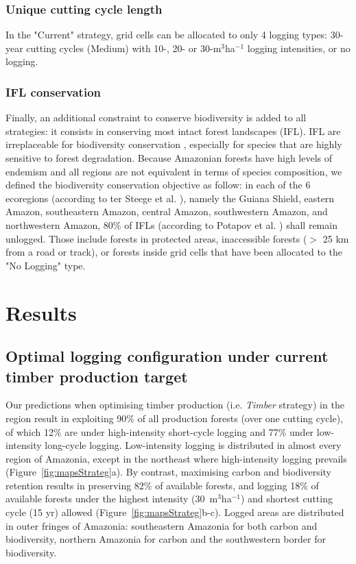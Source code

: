 \documentclass{article}
\begin{document}
\subsubsection{Unique cutting cycle length}

In the "Current" strategy, grid cells can be allocated to only 4 logging types: 30-year cutting cycles (Medium) with 10-, 20- or 30-m$^3$ha$^{-1}$ logging intensities, or no logging. 

\subsubsection{IFL conservation}

Finally, an additional constraint  to conserve biodiversity is added to all strategies: it consists in conserving most intact forest landscapes (IFL). IFL are irreplaceable for biodiversity conservation \cite{Gibson2011}, especially for species that are highly sensitive to forest degradation. Because Amazonian forests have high levels of endemism and all regions are not equivalent in terms of species composition, we defined the biodiversity conservation objective as follow: in each of the 6 ecoregions (according to ter Steege et al. \cite{TerSteege2013}), namely the Guiana Shield, eastern Amazon, southeastern Amazon, central Amazon, southwestern Amazon, and northwestern Amazon, 80\% of IFLs (according to Potapov et al. \cite{Potapov2017}) shall remain unlogged. Those include forests in protected areas, inaccessible forests ($>$ 25 km from a road or track), or forests inside grid cells that have been allocated to the "No Logging" type. 

\section{Results}

\subsection{Optimal logging configuration under current timber production target}

Our predictions when optimising timber production (i.e. \textit{Timber} strategy) in the region result in exploiting 90\% of all production forests (over one cutting cycle), of which 12\% are under high-intensity short-cycle logging and 77\% under low-intensity long-cycle logging. Low-intensity logging is distributed in almost every region of Amazonia, except in the northeast where high-intensity logging prevails (Figure~\ref{fig:mapsStrateg}a). 
By contrast, maximising carbon and biodiversity retention results in preserving 82\% of available forests, and logging 18\% of available forests under the highest intensity (30~m$^3$ha$^{-1}$) and shortest cutting cycle (15 yr) allowed (Figure~\ref{fig:mapsStrateg}b-c). Logged areas are distributed in outer fringes of Amazonia: southeastern Amazonia for both carbon and biodiversity, northern Amazonia for carbon and the southwestern border for biodiversity.  
\end{document}
